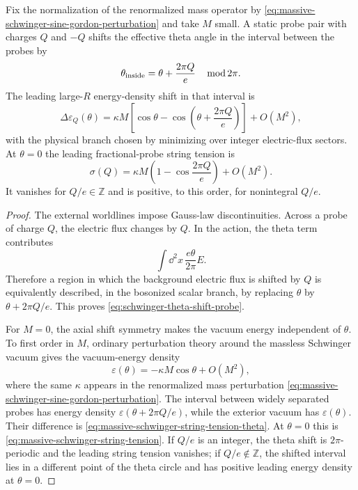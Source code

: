 \begin{proposition}
\label{prop:massive-schwinger-fractional-string-tension}
Fix the normalization of the renormalized mass operator by
\eqref{eq:massive-schwinger-sine-gordon-perturbation} and take \(M\) small.
A static probe pair with charges \(Q\) and \(-Q\) shifts the effective theta
angle in the interval between the probes by
\begin{equation}
  \theta_{\rm inside}
  =
  \theta+\frac{2\pi Q}{e}
  \quad
  \operatorname{mod} 2\pi .
  \label{eq:schwinger-theta-shift-probe}
\end{equation}
The leading large-\(R\) energy-density shift in that interval is
\begin{equation}
  \Delta\varepsilon_Q(\theta)
  =
  \kappa M
  \left[
    \cos\theta-\cos\!\left(\theta+\frac{2\pi Q}{e}\right)
  \right]
  +O(M^2),
  \label{eq:massive-schwinger-string-tension-theta}
\end{equation}
with the physical branch chosen by minimizing over integer electric-flux
sectors.  At \(\theta=0\) the leading fractional-probe string tension is
\begin{equation}
  \sigma(Q)
  =
  \kappa M
  \left(1-\cos\frac{2\pi Q}{e}\right)
  +O(M^2).
  \label{eq:massive-schwinger-string-tension}
\end{equation}
It vanishes for \(Q/e\in\mathbb Z\) and is positive, to this order, for
nonintegral \(Q/e\).
\end{proposition}

\begin{proof}
The external worldlines impose Gauss-law discontinuities.  Across a probe of
charge \(Q\), the electric flux changes by \(Q\).  In the action, the theta
term contributes
\[
  \int\dd^2x\,\frac{e\theta}{2\pi}E .
\]
Therefore a region in which the background electric flux is shifted by
\(Q\) is equivalently described, in the bosonized scalar branch, by replacing
\(\theta\) by \(\theta+2\pi Q/e\).  This proves
\eqref{eq:schwinger-theta-shift-probe}.

For \(M=0\), the axial shift symmetry makes the vacuum energy independent of
\(\theta\).  To first order in \(M\), ordinary perturbation theory around the
massless Schwinger vacuum gives the vacuum-energy density
\[
  \varepsilon(\theta)
  =
  -\kappa M\cos\theta+O(M^2),
\]
where the same \(\kappa\) appears in the renormalized mass perturbation
\eqref{eq:massive-schwinger-sine-gordon-perturbation}.  The interval between
widely separated probes has energy density
\(\varepsilon(\theta+2\pi Q/e)\), while the exterior vacuum has
\(\varepsilon(\theta)\).  Their difference is
\eqref{eq:massive-schwinger-string-tension-theta}.  At \(\theta=0\) this is
\eqref{eq:massive-schwinger-string-tension}.  If \(Q/e\) is an integer, the
theta shift is \(2\pi\)-periodic and the leading string tension vanishes; if
\(Q/e\notin\mathbb Z\), the shifted interval lies in a different point of the
theta circle and has positive leading energy density at \(\theta=0\).
\end{proof}

